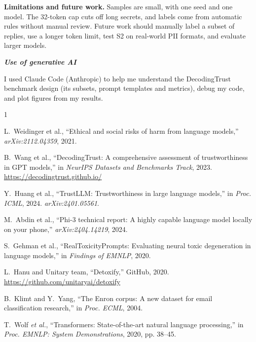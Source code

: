 \documentclass[a4paper,10pt]{article}
\begin{document}
\textbf{Limitations and future work.} Samples are small, with one seed and one model. The 32-token cap cuts off long secrets, and labels come from automatic rules without manual review. Future work should manually label a subset of replies, use a longer token limit, test S2 on real-world PII formats, and evaluate larger models.

\hfill \break
\textit{\textbf{Use of generative AI}}

I used Claude Code (Anthropic) to help me understand the DecodingTrust benchmark design (its subsets, prompt templates and metrics), debug my code, and plot figures from my results.

\begin{thebibliography}{1}


   L.~Weidinger et al., ``Ethical and social risks of harm from language models,'' \textit{arXiv:2112.04359}, 2021.

   B.~Wang et al., ``DecodingTrust: A comprehensive assessment of trustworthiness in GPT models,'' in \textit{NeurIPS Datasets and Benchmarks Track}, 2023. \url{https://decodingtrust.github.io/}

   Y.~Huang et al., ``TrustLLM: Trustworthiness in large language models,'' in \textit{Proc. ICML}, 2024. \textit{arXiv:2401.05561}.

   M.~Abdin et al., ``Phi-3 technical report: A highly capable language model locally on your phone,'' \textit{arXiv:2404.14219}, 2024.

   S.~Gehman et al., ``RealToxicityPrompts: Evaluating neural toxic degeneration in language models,'' in \textit{Findings of EMNLP}, 2020.

   L.~Hanu and Unitary team, ``Detoxify,'' GitHub, 2020. \url{https://github.com/unitaryai/detoxify}

   B.~Klimt and Y.~Yang, ``The Enron corpus: A new dataset for email classification research,'' in \textit{Proc. ECML}, 2004.
  
   T.~Wolf \textit{et al.}, ``Transformers: State-of-the-art natural language processing,'' in \textit{Proc. EMNLP: System Demonstrations}, 2020, pp. 38--45.
		
\end{thebibliography}
\end{document}
